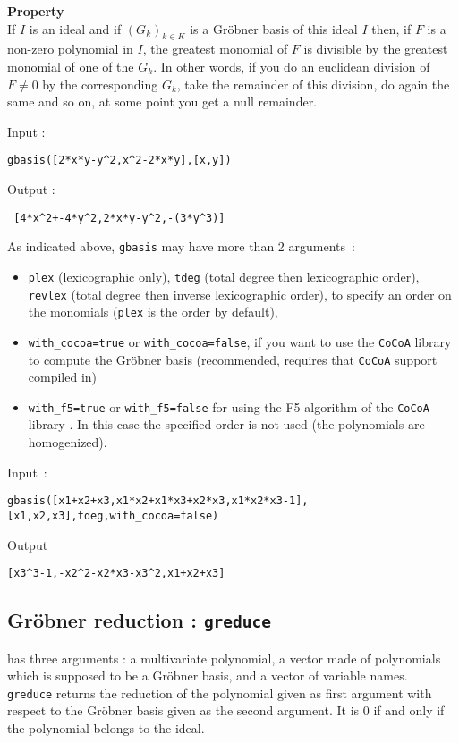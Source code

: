 \documentclass[a4paper,11pt]{book}
\begin{document}
{\bf Property}\\
If $I$ is an ideal and if $(G_k)_{k \in K}$ is a Gr\"obner basis of this 
ideal $I$ then, if $F$ is a non-zero polynomial in $I$, the greatest monomial 
of $F$ is divisible by the greatest monomial of one of the $G_k$.
In other words, if you do an euclidean division of $F\neq 0$ 
by the corresponding $G_k$, take the remainder of this division, do
again the same and so on, at some point you get a null remainder.
  
Input :
\begin{center}{\tt gbasis([2*x*y-y\verb|^|2,x\verb|^|2-2*x*y],[x,y])}
\end{center}
Output :
\begin{center}{\tt
 [4*x\verb|^|2+-4*y\verb|^|2,2*x*y-y\verb|^|2,-(3*y\verb|^|3)]}
\end{center}

As indicated above, {\tt gbasis} may have more than 2 arguments~:
\begin{itemize}
\item {\tt plex} (lexicographic only), {\tt tdeg} (total degree then
lexicographic order),
{\tt revlex} (total degree then inverse lexicographic order), to
specify an order on the monomials 
({\tt plex} is the order by default),
\item {\tt with\_cocoa=true} or {\tt with\_cocoa=false}, if you want to use
the {\tt CoCoA} library to compute the Gr\"obner basis (recommended,
requires that {\tt CoCoA} support compiled in)

\item {\tt with\_f5=true} or {\tt with\_f5=false} for using the F5 algorithm
of the {\tt CoCoA} library .
In this case the  specified order is not used (the polynomials are 
homogenized).
\end{itemize}
Input~:
\begin{center}
{\tt gbasis([x1+x2+x3,x1*x2+x1*x3+x2*x3,x1*x2*x3-1], [x1,x2,x3],tdeg,with\_cocoa=false)}
\end{center}
Output
\begin{center}
\verb|[x3^3-1,-x2^2-x2*x3-x3^2,x1+x2+x3]|
\end{center}

\subsection{Gr\"obner reduction : {\tt greduce}}
 has three arguments : a multivariate
polynomial, 
a vector made of polynomials which is supposed to be a Gr\"obner
basis,  and a vector of variable names.\\
{\tt greduce} returns the reduction of 
the polynomial given as first argument
with respect to the Gr\"obner basis given as the second argument.
It is 0 if and only if the polynomial belongs to the ideal.
\end{document}
